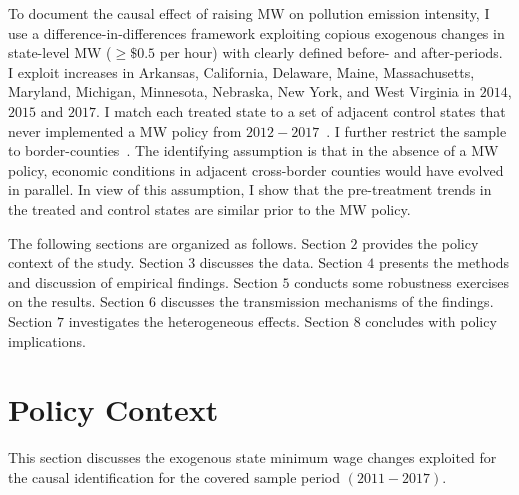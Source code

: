 \documentclass[12pt, english]{article}
\begin{document}
    To document the causal effect of raising MW on pollution emission intensity, I use a difference-in-differences framework exploiting copious exogenous changes in state-level MW ($\geq \$0.5$ per hour) with clearly defined before- and after-periods. I exploit increases in Arkansas, California, Delaware, Maine, Massachusetts, Maryland, Michigan, Minnesota, Nebraska, New York, and West Virginia in $2014$, $2015$ and $2017$. I match each treated state to a set of adjacent control states that never implemented a MW policy from $2012-2017$~\parencite{gopalan2021state}. I further restrict the sample to border-counties~\parencite{dube2010minimum}. The identifying assumption is that in the absence of a MW policy, economic conditions in adjacent cross-border counties would have evolved in parallel. In view of this assumption, I show that the pre-treatment trends in the treated and control states are similar prior to the MW policy.



    The following sections are organized as follows. Section $2$ provides the policy context of the study. Section $3$ discusses the data. Section $4$ presents the methods and discussion of empirical findings. Section $5$ conducts some robustness exercises on the results. Section $6$ discusses the transmission mechanisms of the findings. Section $7$ investigates the heterogeneous effects. Section $8$ concludes with policy implications.


    \section{Policy Context}\label{sec:policy-context}
    This section discusses the exogenous state minimum wage changes exploited for the causal identification for the covered sample period $(2011-2017)$.
\end{document}
